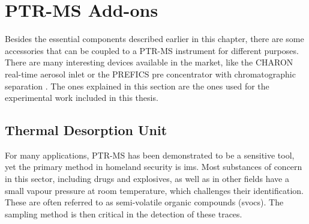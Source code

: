 





\section{PTR-MS Add-ons}
Besides the essential components described  earlier in this chapter, there are some accessories that can be coupled to a PTR-MS instrument for different purposes.
There are many interesting devices available in the market, like the CHARON real-time aerosol inlet \cite{muller2017direct,piel2019airborne} or the PREFICS pre concentrator with chromatographic separation \cite{prefics}.
The ones explained in this section are the ones used for the experimental work included in this thesis.




\subsection{Thermal Desorption Unit}\label{section:tdu}
For many applications, PTR-MS has been demonstrated to be a sensitive tool, yet the primary method in homeland security is \acrshort{ims}.
%
Most substances of concern in this sector, including drugs and explosives, as well as in other fields have a small vapour pressure at room temperature, which challenges their identification. These are often referred to as semi-volatile organic compounds (\acrshort{svoc}s).
%
The sampling method is then critical in the detection of these traces.


